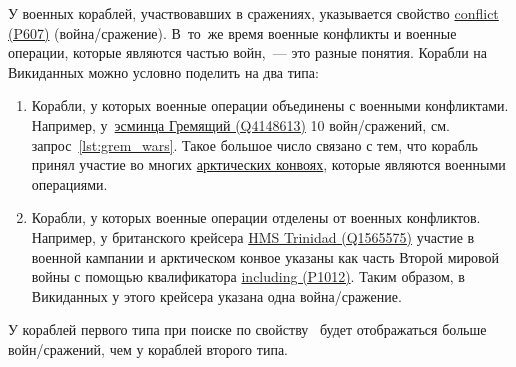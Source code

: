 \newpage
У военных кораблей, участвовавших в сражениях, 
указывается свойство 
\href{https://www.wikidata.org/wiki/Property:P607}{conflict (P607)} (война/сражение). 
В~то~же время военные конфликты и военные операции, 
которые являются частью войн,~--- это разные понятия. 
Корабли на Викиданных можно условно поделить на два типа:

\begin{enumerate}
  \item Корабли, у которых военные операции объединены с военными конфликтами. 
      Например, у~\href{https://www.wikidata.org/wiki/Q4148613}{эсминца Гремящий (Q4148613)} 10 войн/сражений, 
        см. запрос~\ref{lst:grem_wars}. 
        Такое большое число связано с тем, 
        что корабль принял участие во многих 
        \href{https://ru.wikipedia.org/wiki/Арктические_конвои}{арктических конвоях}, 
        которые являются военными операциями.

  \item Корабли, у которых военные операции отделены от военных конфликтов. Например, у британского крейсера \href{https://www.wikidata.org/wiki/Q1565575}{HMS Trinidad (Q1565575)} участие в военной кампании и арктическом конвое указаны как часть Второй мировой войны с помощью квалификатора \href{https://www.wikidata.org/wiki/Property:P1012}{including (P1012)}. Таким образом, в Викиданных у этого крейсера указана одна война/сражение.
\end{enumerate}

У кораблей первого типа при поиске по свойству~ будет отображаться больше войн/сражений, чем у кораблей второго типа. 



